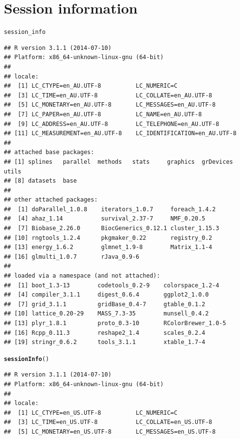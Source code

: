 \documentclass{article}\usepackage[]{graphicx}\usepackage[]{color}
\makeatletter
\newcommand{\hlstd}[1]{\textcolor[rgb]{0.345,0.345,0.345}{#1}}%
\newcommand{\hlkwd}[1]{\textcolor[rgb]{0.737,0.353,0.396}{\textbf{#1}}}%
\newenvironment{kframe}{%
 \def\at@end@of@kframe{}%
 \ifinner\ifhmode%
  \def\at@end@of@kframe{\end{minipage}}%
  \begin{minipage}{\columnwidth}%
 \fi\fi%
 \def\FrameCommand##1{\hskip\@totalleftmargin \hskip-\fboxsep
 \colorbox{shadecolor}{##1}\hskip-\fboxsep
     \hskip-\linewidth \hskip-\@totalleftmargin \hskip\columnwidth}%
 \MakeFramed {\advance\hsize-\width
   \@totalleftmargin\z@ \linewidth\hsize
   \@setminipage}}%
 {\par\unskip\endMakeFramed%
 \at@end@of@kframe}
\newenvironment{knitrout}{}{} %
\makeatother
\begin{document}
\section{Session information}
\begin{knitrout}
\color{fgcolor}\begin{kframe}
\begin{alltt}
\hlstd{session_info}
\end{alltt}
\begin{verbatim}
## R version 3.1.1 (2014-07-10)
## Platform: x86_64-unknown-linux-gnu (64-bit)
## 
## locale:
##  [1] LC_CTYPE=en_AU.UTF-8          LC_NUMERIC=C                 
##  [3] LC_TIME=en_AU.UTF-8           LC_COLLATE=en_AU.UTF-8       
##  [5] LC_MONETARY=en_AU.UTF-8       LC_MESSAGES=en_AU.UTF-8      
##  [7] LC_PAPER=en_AU.UTF-8          LC_NAME=en_AU.UTF-8          
##  [9] LC_ADDRESS=en_AU.UTF-8        LC_TELEPHONE=en_AU.UTF-8     
## [11] LC_MEASUREMENT=en_AU.UTF-8    LC_IDENTIFICATION=en_AU.UTF-8
## 
## attached base packages:
## [1] splines   parallel  methods   stats     graphics  grDevices utils    
## [8] datasets  base     
## 
## other attached packages:
##  [1] doParallel_1.0.8    iterators_1.0.7     foreach_1.4.2      
##  [4] ahaz_1.14           survival_2.37-7     NMF_0.20.5         
##  [7] Biobase_2.26.0      BiocGenerics_0.12.1 cluster_1.15.3     
## [10] rngtools_1.2.4      pkgmaker_0.22       registry_0.2       
## [13] energy_1.6.2        glmnet_1.9-8        Matrix_1.1-4       
## [16] glmulti_1.0.7       rJava_0.9-6        
## 
## loaded via a namespace (and not attached):
##  [1] boot_1.3-13        codetools_0.2-9    colorspace_1.2-4  
##  [4] compiler_3.1.1     digest_0.6.4       ggplot2_1.0.0     
##  [7] grid_3.1.1         gridBase_0.4-7     gtable_0.1.2      
## [10] lattice_0.20-29    MASS_7.3-35        munsell_0.4.2     
## [13] plyr_1.8.1         proto_0.3-10       RColorBrewer_1.0-5
## [16] Rcpp_0.11.3        reshape2_1.4       scales_0.2.4      
## [19] stringr_0.6.2      tools_3.1.1        xtable_1.7-4
\end{verbatim}
\begin{alltt}
\hlkwd{sessionInfo}\hlstd{()}
\end{alltt}
\begin{verbatim}
## R version 3.1.1 (2014-07-10)
## Platform: x86_64-unknown-linux-gnu (64-bit)
## 
## locale:
##  [1] LC_CTYPE=en_US.UTF-8          LC_NUMERIC=C                 
##  [3] LC_TIME=en_US.UTF-8           LC_COLLATE=en_US.UTF-8       
##  [5] LC_MONETARY=en_US.UTF-8       LC_MESSAGES=en_US.UTF-8      

\end{verbatim}
\end{kframe}
\end{knitrout}
\end{document}
